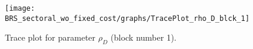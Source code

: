 \begin{figure}[H]
\centering
  \texttt{[image: BRS\_sectoral\_wo\_fixed\_cost/graphs/TracePlot\_rho\_D\_blck\_1]}\\
    \caption{Trace plot for parameter ${\rho_D}$ (block number 1).}
\end{figure}
